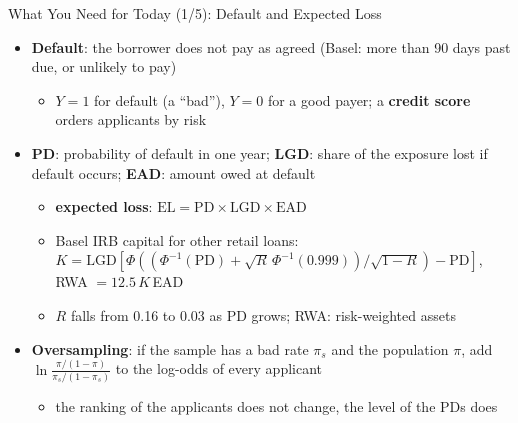 \begin{frame}{What You Need for Today (1/5): Default and Expected Loss}
\itemsize{\footnotesize}
\begin{itemize}
    \item \textbf{Default}: the borrower does not pay as agreed (Basel: more than 90 days past due, or unlikely to pay) 
    \begin{itemize}
        \item $Y = 1$ for default (a ``bad''), $Y = 0$ for a good payer; a \textbf{credit score} orders applicants by risk
    \end{itemize}
    \item \textbf{PD}: probability of default in one year; \textbf{LGD}: share of the exposure lost if default occurs; \textbf{EAD}: amount owed at default
    \begin{itemize}
        \item \textbf{expected loss}: $\mathrm{EL} = \mathrm{PD} \times \mathrm{LGD} \times \mathrm{EAD}$
        \item Basel IRB capital for other retail loans: $K = \mathrm{LGD}[\Phi((\Phi^{-1}(\mathrm{PD}) + \sqrt{R}\,\Phi^{-1}(0.999))/\sqrt{1 - R}) - \mathrm{PD}]$, RWA $= 12.5\,K\,$EAD
        \item $R$ falls from 0.16 to 0.03 as PD grows; RWA: risk-weighted assets
    \end{itemize}
    \item \textbf{Oversampling}: if the sample has a bad rate $\pi_s$ and the population $\pi$, add $\ln\frac{\pi/(1 - \pi)}{\pi_s/(1 - \pi_s)}$ to the log-odds of every applicant
    \begin{itemize}
        \item the ranking of the applicants does not change, the level of the PDs does
    \end{itemize}
\end{itemize}
\end{frame}

